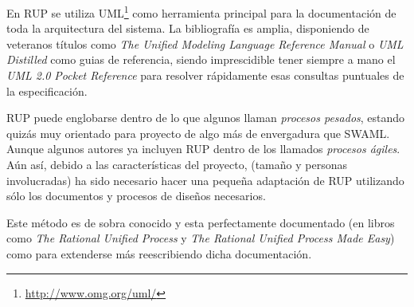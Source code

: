 En RUP se utiliza UML\footnote{\url{http://www.omg.org/uml/}} como herramienta principal
para la documentación de toda la arquitectura del sistema. La bibliografía es amplia,
disponiendo de veteranos títulos como 
\emph{The Unified Modeling Language Reference Manual}\cite{UMLReference} o 
\emph{UML Distilled}\cite{UMLDistilled} como guias de referencia, siendo imprescidible
tener siempre a mano el \emph{UML 2.0 Pocket Reference}\cite{UMLPocket} para resolver
rápidamente esas consultas puntuales de la especificación.

RUP puede englobarse dentro de lo que algunos llaman \emph{procesos pesados},
estando quizás muy orientado para proyecto de algo más de envergadura que SWAML.
Aunque algunos autores\cite{Larman2004} ya incluyen RUP dentro de los llamados 
\emph{procesos ágiles}. Aún así, debido a las características del proyecto, 
(tamaño y personas involucradas) ha sido necesario hacer una pequeña adaptación 
de RUP utilizando sólo los documentos y procesos de diseños necesarios.

Este método es de sobra conocido y esta perfectamente documentado (en libros como
\emph{The Rational Unified Process}\cite{RUPIntro} y
\emph{The Rational Unified Process Made Easy}\cite{RUPEasy}) como para
extenderse más reescribiendo dicha documentación.
